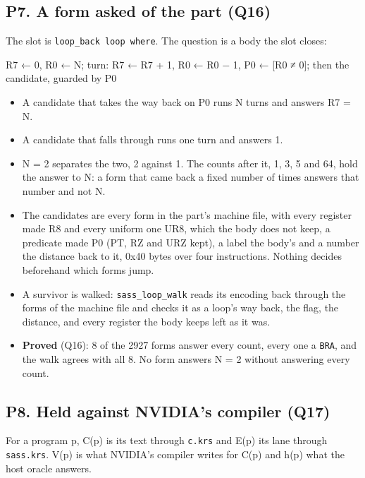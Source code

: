 \subsection{\texorpdfstring{P7. A form asked of the part (Q16)}{P7. A form asked of the part (Q16)}}

The slot is \texttt{loop\_\allowbreak{}back loop where}. The question is a body the slot closes:

R7 ← 0, R0 ← N;  turn: R7 ← R7 + 1, R0 ← R0 − 1, P0 ← [R0 ≠ 0];  then the candidate, guarded by P0

\begin{itemize}
\item A candidate that takes the way back on P0 runs N turns and answers R7 = N.
\item A candidate that falls through runs one turn and answers 1.
\item N = 2 separates the two, 2 against 1. The counts after it, 1, 3, 5 and 64, hold the answer to N: a form that came back a fixed number of times answers that number and not N.
\item The candidates are every form in the part's machine file, with every register made R8 and every uniform one UR8, which the body does not keep, a predicate made P0 (PT, RZ and URZ kept), a label the body's and a number the distance back to it, 0x40 bytes over four instructions. Nothing decides beforehand which forms jump.
\item A survivor is walked: \texttt{sass\_\allowbreak{}loop\_\allowbreak{}walk} reads its encoding back through the forms of the machine file and checks it as a loop's way back, the flag, the distance, and every register the body keeps left as it was.
\item \textbf{Proved} (Q16): 8 of the 2927 forms answer every count, every one a \texttt{BRA}, and the walk agrees with all 8. No form answers N = 2 without answering every count.
\end{itemize}

\subsection{\texorpdfstring{P8. Held against NVIDIA's compiler (Q17)}{P8. Held against NVIDIA's compiler (Q17)}}

For a program p, C(p) is its text through \texttt{c.\allowbreak{}krs} and E(p) its lane through \texttt{sass.\allowbreak{}krs}. V(p) is what NVIDIA's compiler writes for C(p) and h(p) what the host oracle answers.

